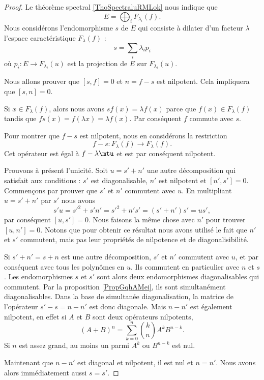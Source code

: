 \begin{proof}
    Le théorème spectral \ref{ThoSpectraluRMLok} nous indique que
    \begin{equation}
        E=\bigoplus_iF_{\lambda_i}(f).
    \end{equation}
    Nous considérons l'endomorphisme \( s\) de \( E\) qui consiste à dilater d'un facteur \( \lambda\) l'espace caractéristique \( F_{\lambda}(f)\) :
    \begin{equation}
        s=\sum_i\lambda_ip_i
    \end{equation}
    où \( p_i\colon E\to F_{\lambda_i}(u)\) est la projection de \( E\) sur \( F_{\lambda_i}(u)\).

    Nous allons prouver que \( [s,f]=0\) et \( n=f-s\) est nilpotent. Cela impliquera que \( [s,n]=0\).

    Si \( x\in F_{\lambda}(f)\), alors nous avons \( sf(x)=\lambda f(x)\) parce que \( f(x)\in F_{\lambda}(f)\) tandis que \( fs(x)=f(\lambda x)=\lambda f(x)\). Par conséquent \( f\) commute avec \( s\).

    Pour montrer que \( f-s\) est nilpotent, nous en considérons la restriction
    \begin{equation}
        f-s\colon F_{\lambda}(f)\to F_{\lambda}(f).
    \end{equation}
    Cet opérateur est égal à \( f-\lambda\mtu\) et est par conséquent nilpotent.

    Prouvons à présent l'unicité. Soit \( u=s'+n'\) une autre décomposition qui satisfait aux conditions : \( s'\) est diagonalisable, \( n'\) est nilpotent et \( [n',s']=0\). Commençons par prouver que \( s'\) et \( n'\) commutent avec \( u\). En multipliant \( u=s'+n'\) par \( s'\) nous avons
    \begin{equation}
        s'u=s'^2+s'n'=s'^2+n's'=(s'+n')s'=us',
    \end{equation}
    par conséquent \( [u,s']=0\). Nous faisons la même chose avec \( n'\) pour trouver \( [u,n']=0\). Notons que pour obtenir ce résultat nous avons utilisé le fait que \( n'\) et \( s'\) commutent, mais pas leur propriétés de nilpotence et de diagonalisibilité.
    
    
    Si \( s'+n'=s+n\) est une autre décomposition, \( s'\) et \( n'\) commutent avec \( u\), et par conséquent avec tous les polynômes en \( u\). Ils commutent en particulier avec \( n\) et \( s\). Les endomorphismes \( s\) et \( s'\) sont alors deux endomorphismes diagonalisables qui commutent. Par la proposition \ref{PropGqhAMei}, ils sont simultanément diagonalisables. Dans la base de simultanée diagonalisation, la matrice de l'opérateur \( s'-s=n-n'\) est donc diagonale. Mais \( n-n'\) est également nilpotent, en effet si \( A\) et \( B\) sont deux opérateurs nilpotents,
    \begin{equation}
        (A+B)^n=\sum_{k=0}^n\binom{k}{n}A^kB^{n-k}.
    \end{equation}
    Si \( n\) est assez grand, au moins un parmi \( A^k\) ou \( B^{n-k}\) est nul.

    Maintenant que \( n-n'\) est diagonal et nilpotent, il est nul et \( n=n'\). Nous avons alors immédiatement aussi \( s=s'\).

\end{proof}

